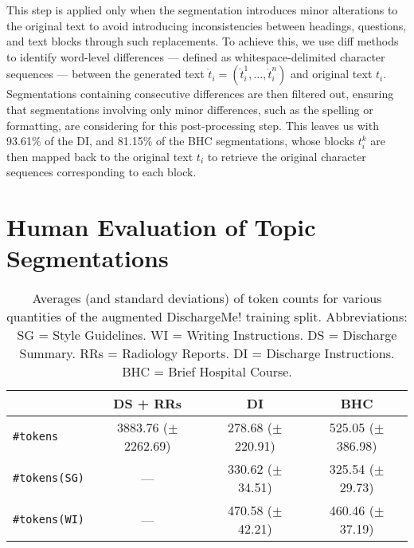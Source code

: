 This step is applied only when the segmentation introduces minor alterations to the original text to avoid introducing inconsistencies between headings, questions, and text blocks through such replacements.  To achieve this, we use diff methods to identify word-level differences --- defined as whitespace-delimited character sequences --- between the generated text $\mathring{t}_i = (\mathring{t}_i^1, \dots, \mathring{t}_i^n)$ and original text $t_i$. Segmentations containing consecutive differences are then filtered out, ensuring that segmentations involving only minor differences, such as the spelling or formatting, are considering for this post-processing step. This leaves us with 93.61\% of the DI, and 81.15\% of the BHC segmentations, whose blocks $t_i^k$ are then mapped back to the original text $t_i$ to retrieve the original character sequences corresponding to each block.


\section{Human Evaluation of Topic Segmentations}
\label{sec:human-evaluation-of-topic-segmentations}

\begin{table*}[ht]
\centering
\begin{tabular}{l|ccc}
\hline
 & DS + RRs & DI & BHC  \\
\hline
\texttt{\#tokens} & 3883.76 ($\pm$ 2262.69) & 278.68  ($\pm$ 220.91) & 525.05 ($\pm$ 386.98) \\
\texttt{\#tokens(SG)} & --- & 330.62 ($\pm$ 34.51) & 325.54 ($\pm$ 29.73) \\
\texttt{\#tokens(WI)} & --- & 470.58 ($\pm$ 42.21) & 460.46 ($\pm$ 37.19) \\
\hline
\end{tabular}
\caption{Averages (and standard deviations) of token counts  for various quantities of the augmented DischargeMe! training split. Abbreviations: SG = Style Guidelines. WI = Writing Instructions. DS = Discharge Summary. RRs = Radiology Reports. DI = Discharge Instructions. BHC = Brief Hospital Course.}
\label{table:dataset_statistics}
\end{table*}

